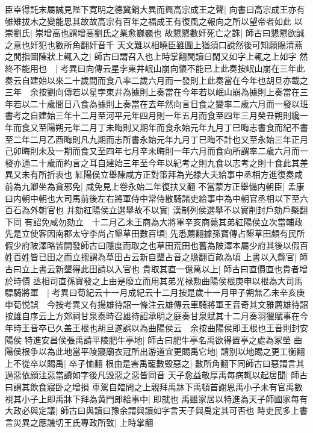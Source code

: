 臣幸得託末屬誠見陛下寛明之德冀銷大異而興高宗成王之聲|{
	向書曰高宗成王亦有雊雉拔木之變能思其故故高宗有百年之福成王有復風之報向之所以望帝者如此}
以崇劉氏|{
	崇增高也謂增高劉氏之業愈巍巍也}
故懇懇數奸死亡之誅|{
	師古曰懇懇欲誠之意也奸犯也數所角翻奸音千}
天文難以相曉臣雖圖上猶須口說然後可知願賜清燕之閒指圖陳狀上輒入之|{
	師古曰謂召入也上時掌翻閒讀曰閑又如字上輒之上如字}
然終不能用也　|{
	考異曰向傳云星孛東井岷山崩向懷不能已上此奏按岷山崩在三年此奏云自建始以來二十歲間而食八率二歲六月而一發則上此奏當在今年也胡旦亦載之三年　余按劉向傳若以星孛東井為據則上奏當在今年若以岷山崩為據則上奏當在三年若以二十歲間日八食為據則上奏當在去年然向言日食之變率二歲六月而一發以班書考之自建始三年十二月至河平元年四月則一年五月而食至四年三月癸丑朔則纔一年而食又至陽朔元年二月丁未晦則又期年而食永始元年九月丁巳晦志書食而紀不書至二年二月乙酉晦則凡九期而志所書永始元年九月丁巳晦不計也又至永始三年正月己卯晦則未及一期而食又至四年七月辛未晦則一年六月而食向所謂率二歲六月而一發亦通二十歲而約言之耳自建始三年至今年以紀考之則九食以志考之則十食此其差異又未有所折衷也}
紅陽侯立舉陳咸方正對策拜為光禄大夫給事中丞相方進復奏咸前為九卿坐為貪邪免|{
	咸免見上卷永始二年復扶又翻}
不當蒙方正舉備内朝臣|{
	孟康曰内朝中朝也大司馬前後左右將軍侍中常侍散騎諸吏給事中為中朝官丞相以下至六百石為外朝官也}
并劾紅陽侯立選舉故不以實|{
	漢制列侯選舉不以實削封戶劾戶槩翻下同}
有詔免咸勿劾立　十二月乙未王商為大將軍辛亥商薨其弟紅陽侯立次當輔政先是立使客因南郡太守李尚占墾草田數百頃|{
	先悉薦翻據孫寶傳占墾草田頗有民所假少府陂澤略皆開發師古曰隱度而取之也草田荒田也舊為陂澤本屬少府其後以假百姓百姓皆已田之而立摠謂為草田占云新自墾占音之贍翻百畝為頃}
上書以入縣官|{
	師古曰立上書云新墾得此田請以入官也}
貴取其直一億萬以上|{
	師古曰直價直也貴者增於時價}
丞相司直孫寶發之上由是廢立而用其弟光禄勲曲陽侯根庚申以根為大司馬驃騎將軍　|{
	考異曰荀紀云十一月成紀云十二月按是歲十一月甲子朔無乙未辛亥庚申荀悦誤　今按考異又有揚雄待詔一條注云雄傳云車騎將軍王音奇其文雅薦雄待詔按雄自序云上方郊祠甘泉泰畤召雄待詔承明之庭奏甘泉賦其十二月奏羽獵賦事在今年時王音卒已久盖王根也胡旦遂誤以為曲陽侯云　余按曲陽侯即王根也王音則封安陽侯}
特進安昌侯張禹請平陵肥牛亭地|{
	師古曰肥牛亭名禹欲得置亭之處為冢塋}
曲陽侯根争以為此地當平陵寢廟衣冠所出游道宜更賜禹它地|{
	請别以地賜之更工衡翻}
上不從卒以賜禹|{
	卒子恤翻}
根由是害禹寵數毁惡之|{
	數所角翻下同師古曰惡謂言其過惡依顔注惡當讀如字後凡毁惡之惡皆同音}
天子愈益敬厚禹每病輒以起居聞|{
	師古曰謂其飲食寢卧之增損}
車駕自臨問之上親拜禹牀下禹頓首謝恩禹小子未有官禹數視其小子上即禹牀下拜為黄門郎給事中|{
	即就也}
禹雖家居以特進為天子師國家每有大政必與定議|{
	師古曰與讀曰豫余謂與讀如字言天子與禹定其可否也}
時吏民多上書言災異之應譏切王氏專政所致|{
	上時掌翻}
